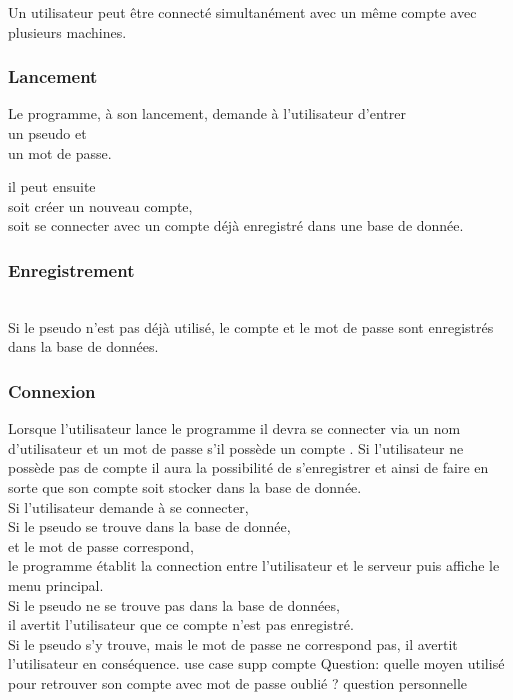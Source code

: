 \documentclass[french, utf8]{article}
\begin{document}
Un utilisateur peut être connecté simultanément avec un même compte avec plusieurs machines.
\subsubsection{Lancement}
Le programme, à son lancement, demande à l’utilisateur d'entrer
\\un pseudo et
\\un mot de passe.

il peut ensuite
\\soit créer un nouveau compte,
\\soit se connecter avec un compte déjà enregistré dans une base de
donnée.

\subsubsection{Enregistrement}
\\ Si le pseudo  n’est pas déjà utilisé, le compte et le mot de passe sont enregistrés dans
la base de données.

\subsubsection{Connexion}
Lorsque l'utilisateur lance le programme il devra se connecter via un nom d'utilisateur et un mot de passe s'il  possède un compte . Si l'utilisateur ne possède pas de compte il aura la possibilité de s'enregistrer et ainsi de faire en sorte que son compte soit stocker dans la base de donnée.
\newline
\\Si l’utilisateur demande à se connecter,
        \\Si le pseudo se trouve dans la base de donnée,
            \\et le mot de passe correspond,
                \\le programme établit la connection entre l'utilisateur et le serveur
                puis affiche le menu principal.
        \\Si le pseudo ne se trouve pas dans la base de données,
            \\il avertit l'utilisateur que ce compte n'est pas enregistré.
        \\Si le pseudo s'y trouve, mais le mot de passe ne correspond
pas,
            il avertit l'utilisateur en conséquence.
\newline
use case
supp compte
Question: quelle moyen utilisé pour retrouver son compte avec mot de passe oublié ? question personnelle
\end{document}
